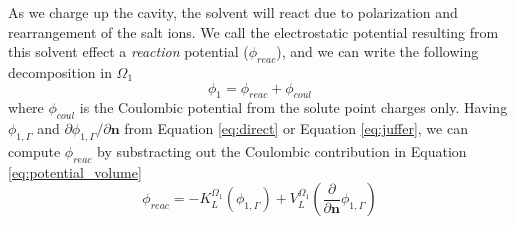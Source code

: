 As we charge up the cavity, the solvent will react due to polarization and rearrangement of the salt ions. 
We call the electrostatic potential resulting from this solvent effect a \emph{reaction} potential ($\phi_{reac}$), and we can write the following decomposition in $\Omega_1$ 
%
\begin{equation}
\phi_1 = \phi_{reac} + \phi_{coul}
\end{equation}
%
where $\phi_{coul}$ is the Coulombic potential from the solute point charges only.
Having $\phi_{1,\Gamma}$ and $\partial\phi_{1,\Gamma}/\partial\mathbf{n}$ from Equation \eqref{eq:direct} or Equation \eqref{eq:juffer}, we can compute $\phi_{reac}$ by substracting out the Coulombic contribution in Equation \eqref{eq:potential_volume}
%
\begin{equation}\label{eq:phi_reac}
\phi_{reac} = -K_{L}^{\Omega_1}(\phi_{1,\Gamma}) +  V_{L}^{\Omega_1} \left(\frac{\partial}{\partial \mathbf{n}}  \phi_{1,\Gamma}  \right) 
\end{equation}
